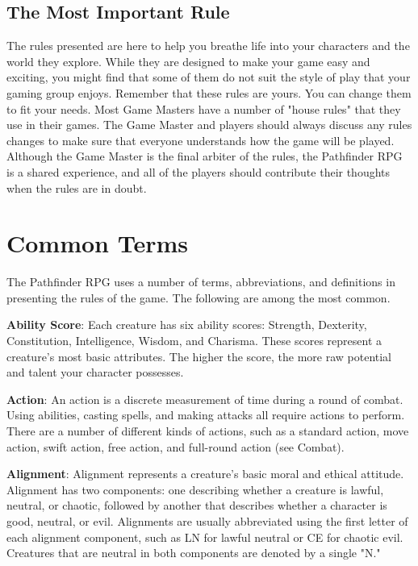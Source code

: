 \subsection{The Most Important Rule}

				
The rules presented are here to help you breathe life into your characters and the world they explore. While they are designed to make your game easy and exciting, you might find that some of them do not suit the style of play that your gaming group enjoys. Remember that these rules are yours. You can change them to fit your needs. Most Game Masters have a number of "house rules" that they use in their games. The Game Master and players should always discuss any rules changes to make sure that everyone understands how the game will be played. Although the Game Master is the final arbiter of the rules, the Pathfinder RPG is a shared experience, and all of the players should contribute their thoughts when the rules are in doubt.
				
\section{Common Terms}

				
The Pathfinder RPG uses a number of terms, abbreviations, and definitions in presenting the rules of the game. The following are among the most common.
				
\textbf{Ability Score}: Each creature has six ability scores: Strength, Dexterity, Constitution, Intelligence, Wisdom, and Charisma. These scores represent a creature's most basic attributes. The higher the score, the more raw potential and talent your character possesses. 
				
\textbf{Action}: An action is a discrete measurement of time during a round of combat. Using abilities, casting spells, and making attacks all require actions to perform. There are a number of different kinds of actions, such as a standard action, move action, swift action, free action, and full-round action (see Combat). 
				
\textbf{Alignment}: Alignment represents a creature's basic moral and ethical attitude. Alignment has two components: one describing whether a creature is lawful, neutral, or chaotic, followed by another that describes whether a character is good, neutral, or evil. Alignments are usually abbreviated using the first letter of each alignment component, such as LN for lawful neutral or CE for chaotic evil. Creatures that are neutral in both components are denoted by a single "N."
				
